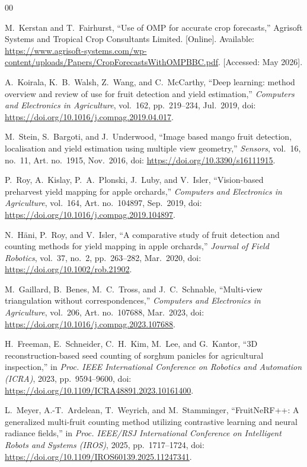 ﻿\documentclass[conference]{IEEEtran}
\begin{document}
\balance
\begin{thebibliography}{00}

M.~Kerstan and T.~Fairhurst,
``Use of OMP for accurate crop forecasts,''
Agrisoft Systems and Tropical Crop Consultants Limited. [Online]. Available:
\url{https://www.agrisoft-systems.com/wp-content/uploads/Papers/CropForecastsWithOMPBBC.pdf}.
[Accessed: May 2026].

A.~Koirala, K.~B.~Walsh, Z.~Wang, and C.~McCarthy,
``Deep learning: method overview and review of use for fruit detection and
yield estimation,''
\textit{Computers and Electronics in Agriculture}, vol.~162, pp.~219--234,
Jul.~2019, doi: \url{https://doi.org/10.1016/j.compag.2019.04.017}.

M.~Stein, S.~Bargoti, and J.~Underwood,
``Image based mango fruit detection, localisation and yield estimation using
multiple view geometry,''
\textit{Sensors}, vol.~16, no.~11, Art. no.~1915, Nov.~2016,
doi: \url{https://doi.org/10.3390/s16111915}.

P.~Roy, A.~Kislay, P.~A.~Plonski, J.~Luby, and V.~Isler,
``Vision-based preharvest yield mapping for apple orchards,''
\textit{Computers and Electronics in Agriculture}, vol.~164, Art. no.~104897,
Sep.~2019, doi: \url{https://doi.org/10.1016/j.compag.2019.104897}.

N.~H\"{a}ni, P.~Roy, and V.~Isler,
``A comparative study of fruit detection and counting methods for yield
mapping in apple orchards,''
\textit{Journal of Field Robotics}, vol.~37, no.~2, pp.~263--282, Mar.~2020,
doi: \url{https://doi.org/10.1002/rob.21902}.

M.~Gaillard, B.~Benes, M.~C.~Tross, and J.~C.~Schnable,
``Multi-view triangulation without correspondences,''
\textit{Computers and Electronics in Agriculture}, vol.~206, Art. no.~107688,
Mar.~2023, doi: \url{https://doi.org/10.1016/j.compag.2023.107688}.

H.~Freeman, E.~Schneider, C.~H.~Kim, M.~Lee, and G.~Kantor,
``3D reconstruction-based seed counting of sorghum panicles for agricultural
inspection,''
in \textit{Proc. IEEE International Conference on Robotics and Automation
(ICRA)}, 2023, pp.~9594--9600, doi:
\url{https://doi.org/10.1109/ICRA48891.2023.10161400}.

L.~Meyer, A.-T.~Ardelean, T.~Weyrich, and M.~Stamminger,
``FruitNeRF++: A generalized multi-fruit counting method utilizing contrastive
learning and neural radiance fields,''
in \textit{Proc. IEEE/RSJ International Conference on Intelligent Robots and
Systems (IROS)}, 2025, pp.~1717--1724, doi:
\url{https://doi.org/10.1109/IROS60139.2025.11247341}.


\end{thebibliography}
\end{document}
